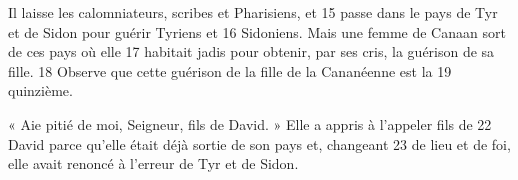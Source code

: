 Il laisse les calomniateurs, scribes et Pharisiens, et	 
15	 	passe dans le pays de Tyr et de Sidon pour guérir Tyriens et	 
16	 	Sidoniens. Mais une femme de Canaan sort de ces pays où elle	 
17	 	habitait jadis pour obtenir, par ses cris, la guérison de sa fille.	 
18	 	Observe que cette guérison de la fille de la Cananéenne est la	 
19	 	quinzième.

« Aie pitié de moi, Seigneur, fils de David. » Elle a appris à l'appeler fils de	 
22	 	David parce qu'elle était déjà sortie de son pays et, changeant	 
23	 	de lieu et de foi, elle avait renoncé à l'erreur de Tyr et de Sidon.